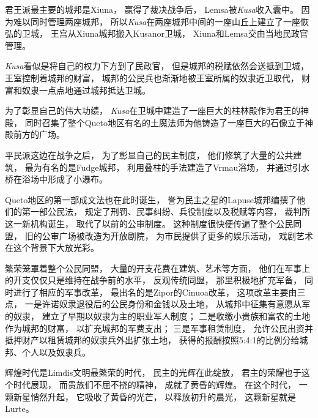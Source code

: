\documentclass[UTF8,12pt,draft]{ctexbook}
\begin{document}
                君王派最主要的城邦是Xiuna，
                赢得了裁决战争后，
                Lemsa被\emph{Kusa}收入囊中。
                因为难以同时管理两座城邦，
                所以\emph{Kusa}在两座城邦中间的一座山丘上建立了一座恢弘的卫城，
                王宫从Xiuna城邦搬入Kusanor卫城，
                Xiuna和Lemsa交由当地民政官管理。

                \emph{Kusa}看似是将自己的权力下方到了民政官，
                但是城邦的税赋依然会送抵到卫城，
                王室控制着城邦的财富，
                城邦的公民兵也渐渐地被王室所属的奴隶近卫取代，
                财富和奴隶一点点地通过城邦抵达卫城。

                为了彰显自己的伟大功绩，
                \emph{Kusa}在卫城中建造了一座巨大的柱林殿作为君王的神殿，
                同时召集了整个Queto地区有名的土魔法师为他铸造了一座巨大的石像立于神殿前方的广场。

                平民派这边在战争之后，
                为了彰显自己的民主制度，
                他们修筑了大量的公共建筑，
                最为有名的是Fudge城邦，
                利用叠柱的手法建造了Vrmau浴场，
                并通过引水桥在浴场中形成了小瀑布。

                Queto地区的第一部成文法也在此时诞生，
                誉为民主之星的Lapuse城邦编撰了他们的第一部公民法，
                规定了刑罚、民事纠纷、兵役制度以及税赋等内容，
                裁判所这一新机构诞生，
                取代了以前的公审制度。
                这种制度很快便传遍了整个公民同盟，
                旧的公审广场被改造为开放剧院，
                为市民提供了更多的娱乐活动，
                戏剧艺术在这个背景下大放光彩。

                繁荣笼罩着整个公民同盟，
                大量的开支花费在建筑、艺术等方面，
                他们在军事上的开支仅仅只是维持在战争前的水平，
                反观传统同盟，
                那里积极地扩充军备，
                同时进行了相应的军事改革，
                最出名的是Zipor的Cinuoa改革，
                这项改革主要由三点，
                一是许诺奴隶退役后的公民身份和金钱以及土地，
                从城邦中征集有意愿从军的奴隶，
                建立了早期以奴隶为主的职业军人制度；
                二是收缴小贵族和富农的土地作为城邦的财富，
                以扩充城邦的军费支出；
                三是军事租赁制度，
                允许公民出资并抵押财产以租赁城邦的奴隶兵外出扩张土地，
                获得的报酬按照5:4:1的比例分给城邦、个人以及奴隶兵。

                辉煌时代是Limdis文明最繁荣的时代，
                民主的光辉在此绽放，
                君主的荣耀也于这个时代展现，
                而贵族们不屈不挠的精神，
                成就了黄昏的辉煌。
                在这个时代，
                一颗新星悄然升起，
                它吸收了黄昏的光芒，
                以释放初升的晨光，
                这颗新星就是Lurte。
\end{document}
